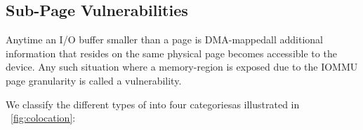 


\subsection{Sub-Page Vulnerabilities}\label{sec:subpage}

Anytime an I/O buffer smaller than a page is DMA-mapped\DIFaddbegin \DIFadd{, }\DIFaddend all additional information that resides on the same physical page becomes accessible to the device. Any such situation where a memory-region is exposed due to the IOMMU page granularity is called a \subpage vulnerability.

We classify the different types of \subpage \DIFdelbegin {}\DIFdelend \DIFaddbegin {}\DIFaddend into four categories\DIFaddbegin \DIFadd{, }\DIFaddend as illustrated in \DIFdelbegin {}\DIFdelend \DIFaddbegin {}\DIFaddend ~\ref{fig:colocation}:

